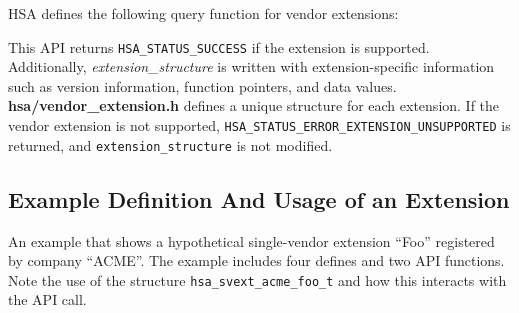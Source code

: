 HSA defines the following query function for vendor extensions:



This API returns \texttt{HSA\_STATUS\_SUCCESS} if the extension is
supported.  Additionally, {\itshape extension\_structure} is written
with extension-specific information such as version information,
function pointers, and data values.  {\bf hsa/vendor\_extension.h} defines
a unique structure for each extension.  If the vendor extension is
not supported, \texttt{HSA\_STATUS\_ERROR\_EXTENSION\_UNSUPPORTED}
is returned, and \texttt{extension\_structure} is not modified.

\subsection{Example Definition And Usage of an Extension}
An example that shows a hypothetical single-vendor extension ``Foo''
registered by company ``ACME''.  The example includes four defines
and two API functions.  Note the use of the structure
\texttt{hsa\_svext\_acme\_foo\_t} and how this interacts with the
 API call.



%
%
%

